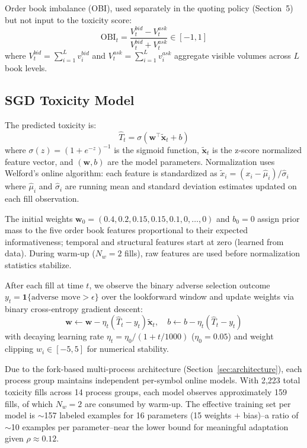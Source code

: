 \documentclass[11pt]{article}
\theoremstyle{definition}
\begin{document}
Order book imbalance (OBI), used separately in the quoting policy (Section~5) but not input to the toxicity score:
\begin{equation}
\text{OBI}_t = \frac{V_t^{bid} - V_t^{ask}}{V_t^{bid} + V_t^{ask}} \in [-1, 1]
\end{equation}
where $V_t^{bid} = \sum_{i=1}^{L} v_i^{bid}$ and $V_t^{ask} = \sum_{i=1}^{L} v_i^{ask}$ aggregate visible volumes across $L$ book levels.

\subsection{SGD Toxicity Model}

The predicted toxicity is:
\begin{equation}
\hat{T}_t = \sigma(\mathbf{w}^\top \tilde{\mathbf{x}}_t + b)
\label{eq:toxicity_sgd}
\end{equation}
where $\sigma(z) = (1 + e^{-z})^{-1}$ is the sigmoid function, $\tilde{\mathbf{x}}_t$ is the z-score normalized feature vector, and $(\mathbf{w}, b)$ are the model parameters. Normalization uses Welford's online algorithm: each feature is standardized as $\tilde{x}_i = (x_i - \hat{\mu}_i) / \hat{\sigma}_i$ where $\hat{\mu}_i$ and $\hat{\sigma}_i$ are running mean and standard deviation estimates updated on each fill observation.

The initial weights $\mathbf{w}_0 = (0.4, 0.2, 0.15, 0.15, 0.1, 0, \ldots, 0)$ and $b_0 = 0$ assign prior mass to the five order book features proportional to their expected informativeness; temporal and structural features start at zero (learned from data). During warm-up ($N_w = 2$ fills), raw features are used before normalization statistics stabilize.

After each fill at time $t$, we observe the binary adverse selection outcome $y_t = \mathbf{1}\{\text{adverse move} > \epsilon\}$ over the lookforward window and update weights via binary cross-entropy gradient descent:
\begin{equation}
\mathbf{w} \leftarrow \mathbf{w} - \eta_t (\hat{T}_t - y_t) \tilde{\mathbf{x}}_t, \quad b \leftarrow b - \eta_t (\hat{T}_t - y_t)
\label{eq:sgd_update}
\end{equation}
with decaying learning rate $\eta_t = \eta_0 / (1 + t/1000)$ ($\eta_0 = 0.05$) and weight clipping $w_i \in [-5, 5]$ for numerical stability.

Due to the fork-based multi-process architecture (Section~\ref{sec:architecture}), each process group maintains independent per-symbol online models. With 2,223 total toxicity fills across 14 process groups, each model observes approximately 159 fills, of which $N_w = 2$ are consumed by warm-up. The effective training set per model is $\sim$157 labeled examples for 16 parameters (15 weights $+$ bias)--a ratio of $\sim$10 examples per parameter--near the lower bound for meaningful adaptation given $\rho \approx 0.12$.
\end{document}
